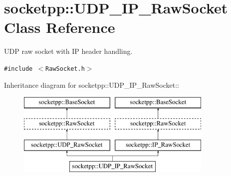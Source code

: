 \hypertarget{classsocketpp_1_1UDP__IP__RawSocket}{
\section{socketpp::UDP\_\-IP\_\-RawSocket Class Reference}
\label{classsocketpp_1_1UDP__IP__RawSocket}
}
UDP raw socket with IP header handling.  


{\tt \#include $<$RawSocket.h$>$}

Inheritance diagram for socketpp::UDP\_\-IP\_\-RawSocket::\begin{figure}[H]
\begin{center}
\leavevmode
\includegraphics[height=4cm]{classsocketpp_1_1UDP__IP__RawSocket}
\end{center}
\end{figure}

